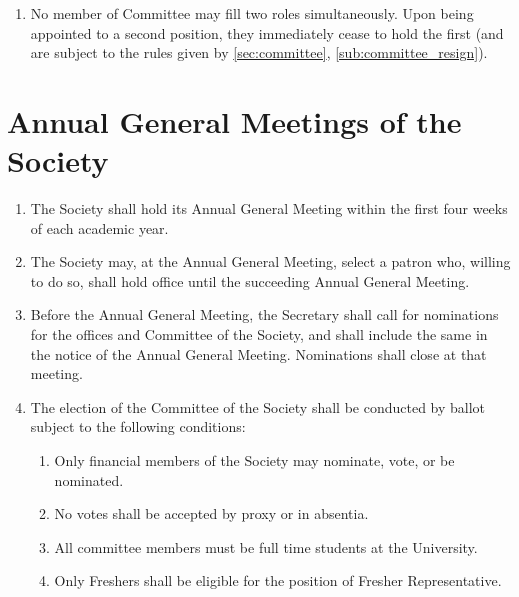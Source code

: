 \documentclass[a4paper]{article}
\begin{document}
\begin{enumerate}
\begin{enumerate}
\begin{enumerate}
        \end{enumerate}
        \item Remain vacant and be filled by election (as per \cref{sec:AGMs}) at the next General Meeting, which must be held within the next 2 weeks.
    \end{enumerate}
    \item No member of Committee may fill two roles simultaneously. Upon being appointed to a second position, they immediately cease to hold the first (and are subject to the rules given by \cref{sec:committee}, \cref{sub:committee_resign}).
\end{enumerate}


\section{Annual General Meetings of the Society} \label{sec:AGMs}
\begin{enumerate}
    \item The Society shall hold its Annual General Meeting within the first four weeks of each academic year.
    \item The Society may, at the Annual General Meeting, select a patron who, willing to do so, shall hold office until the succeeding Annual General Meeting.
    \item Before the Annual General Meeting, the Secretary shall call for nominations for the offices and Committee of the Society, and shall include the same in the notice of the Annual General Meeting. Nominations shall close at that meeting.
    \item The election of the Committee of the Society shall be conducted by ballot subject to the following conditions:
    \begin{enumerate}
        \item Only financial members of the Society may nominate, vote, or be nominated.
        \item No votes shall be accepted by proxy or in absentia.
        \item All committee members must be full time students at the University.
        \item \label{fresher_rep_requirement} Only Freshers shall be eligible for the position of Fresher Representative.
    \end{enumerate}
\end{enumerate}
\end{document}
